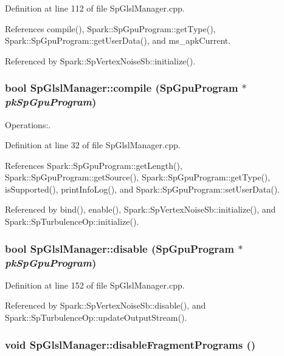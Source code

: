 Definition at line 112 of file Sp\-Glsl\-Manager.cpp.

References compile(), Spark::Sp\-Gpu\-Program::get\-Type(), Spark::Sp\-Gpu\-Program::get\-User\-Data(), and ms\_\-apk\-Current.

Referenced by Spark::Sp\-Vertex\-Noise\-Sb::initialize().
\subsubsection{\setlength{\rightskip}{0pt plus 5cm}bool Sp\-Glsl\-Manager::compile ({\bf Sp\-Gpu\-Program} $\ast$ {\em pk\-Sp\-Gpu\-Program})\hspace{0.3cm}{\tt  [static]}}\label{classSpark_1_1SpGlslManager_e0}


Operations:. 

Definition at line 32 of file Sp\-Glsl\-Manager.cpp.

References Spark::Sp\-Gpu\-Program::get\-Length(), Spark::Sp\-Gpu\-Program::get\-Source(), Spark::Sp\-Gpu\-Program::get\-Type(), is\-Supported(), print\-Info\-Log(), and Spark::Sp\-Gpu\-Program::set\-User\-Data().

Referenced by bind(), enable(), Spark::Sp\-Vertex\-Noise\-Sb::initialize(), and Spark::Sp\-Turbulence\-Op::initialize().
\subsubsection{\setlength{\rightskip}{0pt plus 5cm}bool Sp\-Glsl\-Manager::disable ({\bf Sp\-Gpu\-Program} $\ast$ {\em pk\-Sp\-Gpu\-Program})\hspace{0.3cm}{\tt  [static]}}\label{classSpark_1_1SpGlslManager_e3}


Definition at line 152 of file Sp\-Glsl\-Manager.cpp.

Referenced by Spark::Sp\-Vertex\-Noise\-Sb::disable(), and Spark::Sp\-Turbulence\-Op::update\-Output\-Stream().
\subsubsection{\setlength{\rightskip}{0pt plus 5cm}void Sp\-Glsl\-Manager::disable\-Fragment\-Programs ()\hspace{0.3cm}{\tt  [static]}}\label{classSpark_1_1SpGlslManager_e15}


